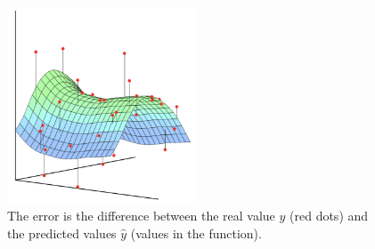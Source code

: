 \begin{figure}[!htb]	\includegraphics[width=0.5\textwidth]{images/errors.png} 
    \centering

\caption{
The error is the difference between the real value $y$ (red dots) and the predicted values $\hat{y}$ (values in the function). \cite{HastieSpringerLearning}
} 

\label{fig:errors}
\end{figure}